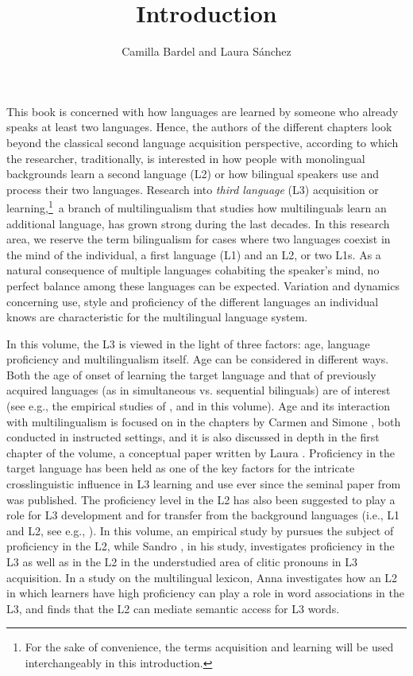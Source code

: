 \documentclass[output=paper,colorlinks,citecolor=brown,nonflat]{langsci/langscibook}
\author{Camilla Bardel and Laura Sánchez \affiliation{}}
\title{Introduction}
\begin{document}
\maketitle

This book is concerned with how languages are learned by someone who already speaks at least two languages. Hence, the authors of the different chapters look beyond the classical second language acquisition perspective, according to which the researcher, traditionally, is interested in how people with monolingual backgrounds learn a second language (L2) or how bilingual speakers use and process their two languages. Research into \textit{third language} (L3) acquisition or learning,\footnote{For the sake of convenience, the terms acquisition and learning will be used interchangeably in this introduction.}~a branch of multilingualism that studies how multilinguals learn an additional language, has grown strong during the last decades. In this research area, we reserve the term bilingualism for cases where two languages coexist in the mind of the individual, a first language (L1) and an L2, or two L1s. As a natural consequence of multiple languages cohabiting the speaker’s mind, no perfect balance among these languages can be expected. Variation and dynamics concerning use, style and proficiency of the different languages an individual knows are characteristic for the multilingual language system.

In this volume, the L3 is viewed in the light of three factors: age, language proficiency and multilingualism itself. Age can be considered in different ways. Both the age of onset of learning the target language and that of previously acquired languages (as in simultaneous vs. sequential bilinguals) are of interest (see e.g., the empirical studies of \citeauthor{chapters/munoz}, \citeauthor{chapters/pfenninger} and \citeauthor{chapters/sanchez7} in this volume). Age and its interaction with multilingualism is focused on in the chapters by Carmen \citeauthor{chapters/munoz} and Simone \citeauthor{chapters/pfenninger}, both conducted in instructed settings, and it is also discussed in depth in the first chapter of the volume, a conceptual paper written by Laura \citeauthor{chapters/sanchez1}. Proficiency in the target language has been held as one of the key factors for the intricate crosslinguistic influence in L3 learning and use ever since the seminal paper from \citet{WilliamsHammarberg1998} was published. The proficiency level in the L2 has also been suggested to play a role for L3 development and for transfer from the background languages (i.e., L1 and L2, see e.g., \citealt{BardelLindqvist2007, SánchezBardel2017Transfer}). In this volume, an empirical study by \citeauthor{chapters/sanchez7} pursues the subject of proficiency in the L2, while Sandro \citeauthor{chapters/sciutti}, in his study, investigates proficiency in the L3 as well as in the L2 in the understudied area of clitic pronouns in L3 acquisition. In a study on the multilingual lexicon, Anna \citeauthor{chapters/gudmundson} investigates how an L2 in which learners have high proficiency can play a role in word associations in the L3, and finds that the L2 can mediate semantic access for L3 words.
\end{document}

